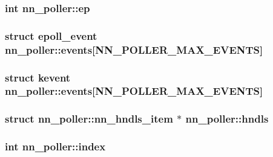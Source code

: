 \subsubsection[{ep}]{\setlength{\rightskip}{0pt plus 5cm}int nn\+\_\+poller\+::ep}\hypertarget{structnn__poller_af927ff1ee0aabc2380bb1f5294c7aec2}{}\label{structnn__poller_af927ff1ee0aabc2380bb1f5294c7aec2}
\subsubsection[{events}]{\setlength{\rightskip}{0pt plus 5cm}struct epoll\+\_\+event nn\+\_\+poller\+::events\mbox{[}{\bf N\+N\+\_\+\+P\+O\+L\+L\+E\+R\+\_\+\+M\+A\+X\+\_\+\+E\+V\+E\+N\+TS}\mbox{]}}\hypertarget{structnn__poller_a2e305f681cba77febc1864f249de5192}{}\label{structnn__poller_a2e305f681cba77febc1864f249de5192}
\subsubsection[{events}]{\setlength{\rightskip}{0pt plus 5cm}struct kevent nn\+\_\+poller\+::events\mbox{[}{\bf N\+N\+\_\+\+P\+O\+L\+L\+E\+R\+\_\+\+M\+A\+X\+\_\+\+E\+V\+E\+N\+TS}\mbox{]}}\hypertarget{structnn__poller_a832e2b68ccf516c6db96c42ec37c65a7}{}\label{structnn__poller_a832e2b68ccf516c6db96c42ec37c65a7}
\subsubsection[{hndls}]{\setlength{\rightskip}{0pt plus 5cm}struct {\bf nn\+\_\+poller\+::nn\+\_\+hndls\+\_\+item} $\ast$ nn\+\_\+poller\+::hndls}\hypertarget{structnn__poller_a4eed53b9b6ece7d8dfbc96bc80f988ce}{}\label{structnn__poller_a4eed53b9b6ece7d8dfbc96bc80f988ce}
\subsubsection[{index}]{\setlength{\rightskip}{0pt plus 5cm}int nn\+\_\+poller\+::index}\hypertarget{structnn__poller_aeca31ffaf2a580f98fc8c727f8a3fa3b}{}\label{structnn__poller_aeca31ffaf2a580f98fc8c727f8a3fa3b}
